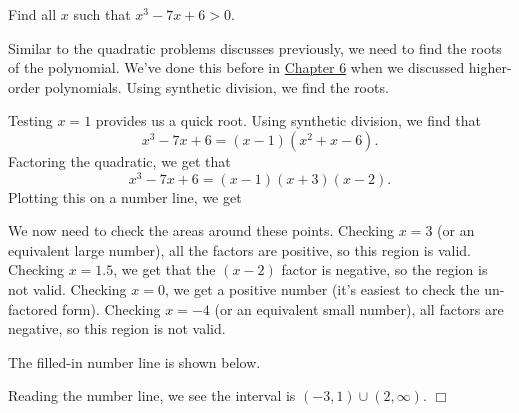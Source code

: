 \documentclass[lang=en,11pt]{elegantbook}
\begin{document}
\begin{example}
Find all $x$ such that $x^3-7x+6>0$.
\end{example}
\begin{solution}
Similar to the quadratic problems discusses previously, we need to find the roots of the polynomial.  We've done this before in \hyperlink{chapter.6}{Chapter 6} when we discussed higher-order polynomials.  Using synthetic division, we find the roots.

Testing $x=1$ provides us a quick root.  Using synthetic division, we find that $$x^3-7x+6=(x-1)(x^2+x-6).$$  Factoring the quadratic, we get that $$x^3-7x+6=(x-1)(x+3)(x-2).$$  Plotting this on a number line, we get
\begin{figure}[!h]
    \centering
\end{figure}

We now need to check the areas around these points.  Checking $x=3$ (or an equivalent large number), all the factors are positive, so this region is valid.  Checking $x=1.5$, we get that the $(x-2)$ factor is negative, so the region is not valid.  Checking $x=0$, we get a positive number (it's easiest to check the un-factored form).  Checking $x=-4$ (or an equivalent small number), all factors are negative, so this region is not valid.

The filled-in number line is shown below.
\begin{figure}[!h]
    \centering
\end{figure}

Reading the number line, we see the interval is $(-3,1)\cup(2,\infty)$. $\Box$
\end{solution}
\end{document}
